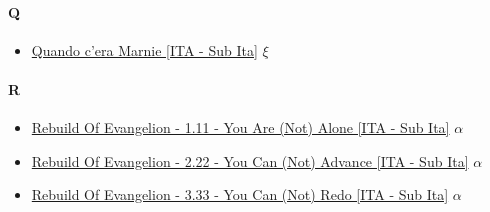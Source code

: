 		\paragraph{Q} \hypertarget{FQ}{}
			\begin{itemize}
		
				\item \href{https://mega.nz/#!CtpzDD7Y!X3PBHceyA19jpv4VGHuvWHiive1aeK6QeaWTU3e6PZs} {Quando c'era Marnie [ITA - Sub Ita]} $\xi$   \\
						
			\end{itemize}
			
		\paragraph{R} \hypertarget{FR}{}
			\begin{itemize}
				
				\item \href{https://mega.nz/#!oEkmALiY!Bum4nqxaNoo37B4sZvlsowaChztOioRCZJPYnFhsr6U} {Rebuild Of Evangelion - 1.11 - You Are (Not) Alone [ITA - Sub Ita]} $\alpha$   \\
				\item \href{https://mega.nz/#!VAdESBKY!_dt0qfK8iHoJnrOFtBXWYZ96zqWz99Hc7frSajzAjkc} {Rebuild Of Evangelion - 2.22 - You Can (Not) Advance [ITA - Sub Ita]} $\alpha$   \\
				\item \href{https://mega.nz/#!AdFGDTKT!d6y7h8EIRjKQVJ3Ey8RNlmUL7SGBFgwm7kFEmpH_TwY} {Rebuild Of Evangelion - 3.33 - You Can (Not) Redo [ITA - Sub Ita]} $\alpha$   \\
				
			\end{itemize}
		
